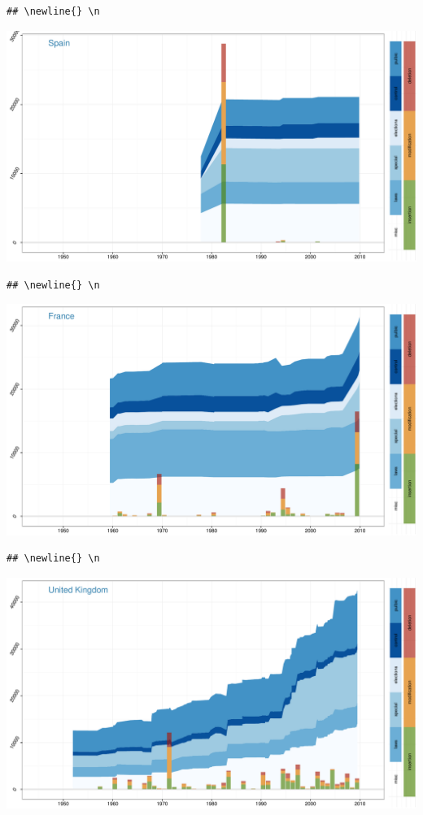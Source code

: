 \documentclass[a4paper, landscape]{article}
\begin{document}
\begin{verbatim}
## \newline{} \n
\end{verbatim}

\includegraphics{country_graphs_files/figure-latex/unnamed-chunk-3-7.pdf}\\

\begin{verbatim}
## \newline{} \n
\end{verbatim}

\includegraphics{country_graphs_files/figure-latex/unnamed-chunk-3-8.pdf}\\

\begin{verbatim}
## \newline{} \n
\end{verbatim}

\includegraphics{country_graphs_files/figure-latex/unnamed-chunk-3-9.pdf}\\
\end{document}
